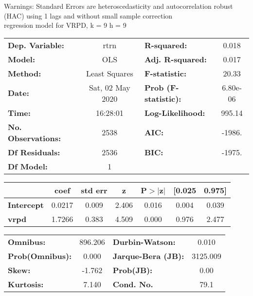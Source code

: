 Warnings: \newline
 [1] Standard Errors are heteroscedasticity and autocorrelation robust (HAC) using 1 lags and without small sample correction\\ 

regression model for VRPD, k = 9 h = 9\begin{center}
\begin{tabular}{lclc}
\toprule
\textbf{Dep. Variable:}    &       rtrn       & \textbf{  R-squared:         } &     0.018   \\
\textbf{Model:}            &       OLS        & \textbf{  Adj. R-squared:    } &     0.017   \\
\textbf{Method:}           &  Least Squares   & \textbf{  F-statistic:       } &     20.33   \\
\textbf{Date:}             & Sat, 02 May 2020 & \textbf{  Prob (F-statistic):} &  6.80e-06   \\
\textbf{Time:}             &     16:28:01     & \textbf{  Log-Likelihood:    } &    995.14   \\
\textbf{No. Observations:} &        2538      & \textbf{  AIC:               } &    -1986.   \\
\textbf{Df Residuals:}     &        2536      & \textbf{  BIC:               } &    -1975.   \\
\textbf{Df Model:}         &           1      & \textbf{                     } &             \\
\bottomrule
\end{tabular}
\begin{tabular}{lcccccc}
                   & \textbf{coef} & \textbf{std err} & \textbf{z} & \textbf{P$> |$z$|$} & \textbf{[0.025} & \textbf{0.975]}  \\
\midrule
\textbf{Intercept} &       0.0217  &        0.009     &     2.406  &         0.016        &        0.004    &        0.039     \\
\textbf{vrpd}      &       1.7266  &        0.383     &     4.509  &         0.000        &        0.976    &        2.477     \\
\bottomrule
\end{tabular}
\begin{tabular}{lclc}
\textbf{Omnibus:}       & 896.206 & \textbf{  Durbin-Watson:     } &    0.010  \\
\textbf{Prob(Omnibus):} &   0.000 & \textbf{  Jarque-Bera (JB):  } & 3125.009  \\
\textbf{Skew:}          &  -1.762 & \textbf{  Prob(JB):          } &     0.00  \\
\textbf{Kurtosis:}      &   7.140 & \textbf{  Cond. No.          } &     79.1  \\
\bottomrule
\end{tabular}
\end{center}

